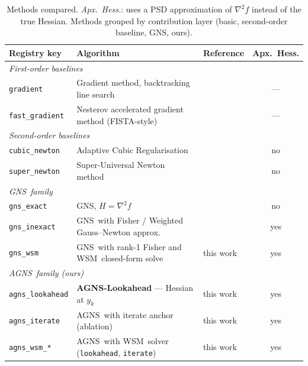 \documentclass[conference]{IEEEtran}
\theoremstyle{remark}
\newcommand{\AGNS}{\textsc{AGNS}}
\newcommand{\GNS}{\textsc{GNS}}
\newcommand{\WSM}{\textsc{WSM}}
\begin{document}
\begin{table}[!t]
\centering
\small
\caption{Methods compared. \emph{Apx.\ Hess.}: uses a PSD approximation
of $\nabla^2 f$ instead of the true Hessian. Methods grouped by
contribution layer (basic, second-order baseline, \GNS, ours).}
\label{tab:methods}
\begin{tabular}{@{}lll@{\quad}c@{}}
\toprule
Registry key & Algorithm & Reference & Apx.\ Hess. \\
\midrule
\multicolumn{4}{l}{\emph{First-order baselines}} \\
\texttt{gradient}        & Gradient method, backtracking line search             & \cite{nesterov2018lectures}            & --- \\
\texttt{fast\_gradient}  & Nesterov accelerated gradient method (FISTA-style)    & \cite{beck2009fast}                    & --- \\
\midrule
\multicolumn{4}{l}{\emph{Second-order baselines}} \\
\texttt{cubic\_newton}   & Adaptive Cubic Regularisation                         & \cite{nesterov2006cubic, cartis2011arc} & no  \\
\texttt{super\_newton}   & Super-Universal Newton method                         & \cite{doikov2024super}                 & no  \\
\midrule
\multicolumn{4}{l}{\emph{\GNS\ family}} \\
\texttt{gns\_exact}      & \GNS, $H = \nabla^2 f$                                & \cite{semenov2025gradient}             & no  \\
\texttt{gns\_inexact}    & \GNS\ with Fisher / Weighted Gauss--Newton approx.    & \cite{semenov2025gradient}             & yes \\
\texttt{gns\_wsm}        & \GNS\ with rank-1 Fisher and \WSM\ closed-form solve  & this work                              & yes \\
\midrule
\multicolumn{4}{l}{\emph{\AGNS\ family (ours)}} \\
\texttt{agns\_lookahead} & \textbf{\AGNS-Lookahead} --- Hessian at $y_k$         & this work                              & yes \\
\texttt{agns\_iterate}   & \AGNS\ with iterate anchor (ablation)                 & this work                              & yes \\
\texttt{agns\_wsm\_*}    & \AGNS\ with \WSM\ solver (\texttt{lookahead}, \texttt{iterate}) & this work                    & yes \\
\bottomrule
\end{tabular}
\end{table}
\end{document}
